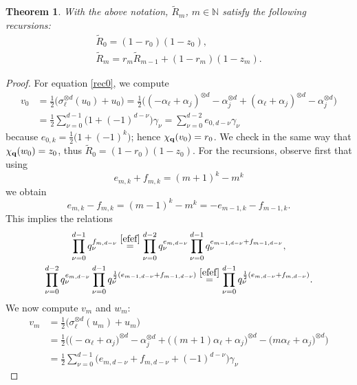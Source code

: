 \documentclass[pdftex]{sigma}
\numberwithin{equation}{section}
\newtheorem{Theorem}{Theorem}[section]
\newcommand{\NN }{\mathbb{N}}
\newcommand{\qq }{{\bf q}}
\newcommand{\dn }{d}
\newcommand{\qR }{\tilde R}
\begin{document}
\begin{Theorem}\label{rosso_rec_d}
With the above notation, $\qR_m$, $m\in\NN$ satisfy the following recursions:
\begin{gather}%
\label{rec0} \qR_0 = (1-r_0)(1-z_0),\\
\label{rec1} \qR_m = r_m \qR_{m-1} + (1-r_m)(1-z_m).
\end{gather}
\end{Theorem}

\begin{proof}
For equation \eqref{rec0}, we compute
\begin{align*}
v_0 &= \frac{1}{2} \big(\sigma_\ell^{\otimes \dn}(u_0)+u_0\big)
= \frac{1}{2}\big((-\alpha_\ell+\alpha_j)^{\otimes \dn} - \alpha_j^{\otimes \dn}
 + (\alpha_\ell+\alpha_j)^{\otimes \dn} - \alpha_j^{\otimes \dn} \big) \\
&= \frac{1}{2}\sum_{\nu=0}^{d-1}\big(1+(-1)^{\dn-\nu}\big)\gamma_\nu
= \sum_{\nu=0}^{d-2} e_{0,\dn-\nu}\gamma_\nu
\end{align*}
because $e_{0,k}=\frac{1}{2}\big(1+(-1)^k\big)$; hence $\chi_\qq(v_0)=r_0$.
We check in the same way that $\chi_\qq(w_0)=z_0$, thus $\qR_0=(1-r_0)(1-z_0)$.
For the recursions, observe first that using
\[e_{m,k}+f_{m,k} = (m+1)^k-m^k\] we obtain
\begin{equation}\label{efef}
e_{m,k}-f_{m,k} = (m-1)^k-m^k = -e_{m-1,k}-f_{m-1,k}.
\end{equation}
This implies the relations
\begin{gather}
\label{ef1} \prod_{\nu=0}^{d-1} q_\nu^{f_{m,\dn-\nu}} \stackrel{\eqref{efef}}{=}
\prod_{\nu=0}^{d-2} q_\nu^{e_{m,\dn-\nu}}
\prod_{\nu=0}^{\dn-1} q_\nu^{e_{m-1,\dn-\nu}+f_{m-1,\dn-\nu}}, \\
\label{ef2} \prod_{\nu=0}^{d-2} q_\nu^{e_{m,\dn-\nu}}
\prod_{\nu=0}^{\dn-1} q_\nu^{\frac{1}{2}(e_{m-1,\dn-\nu}+f_{m-1,\dn-\nu})}
\stackrel{\eqref{efef}}{=} \prod_{\nu=0}^{\dn-1} q_\nu^{\frac{1}{2}(e_{m,\dn-\nu}+f_{m,\dn-\nu})}.
\end{gather}
We now compute $v_m$ and $w_m$:
\begin{align*}
v_m &= \frac{1}{2} \big(\sigma_\ell^{\otimes \dn}(u_m)+u_m\big) \\
&= \frac{1}{2}\big(\big(-\alpha_\ell+\alpha_j\big)^{\otimes \dn} - \alpha_j^{\otimes \dn}
 +\big((m+1)\alpha_\ell+\alpha_j\big)^{\otimes \dn} - \big(m\alpha_\ell+\alpha_j\big)^{\otimes \dn} \big) \\
&= \frac{1}{2}\sum_{\nu=0}^{d-1}\big(e_{m,\dn-\nu}+f_{m,\dn-\nu}+(-1)^{\dn-\nu}\big)\gamma_\nu

\end{align*}
\end{proof}
\end{document}
